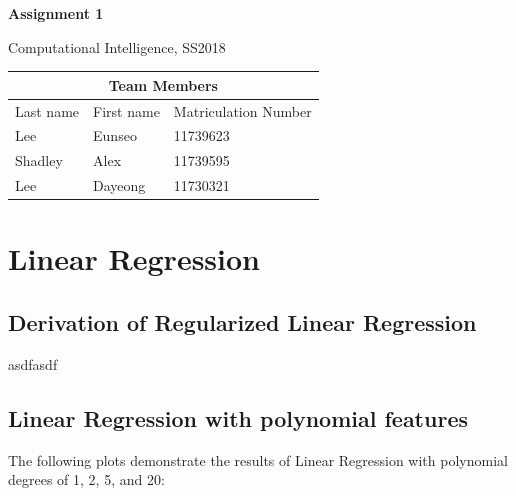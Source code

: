 \documentclass[a4paper]{article}
\begin{document}
\begin{titlepage}
	\centering
	{\huge \bf Assignment 1\par}
	\vspace{1cm}
	{\Large Computational Intelligence, SS2018\par}
	\vspace{1cm}
	\begin{tabular}{|l|l|l|}
	\hline
	\multicolumn{3}{|c|}{\textbf{Team Members}}   \\ \hline
	Last name & First name & Matriculation Number \\ \hline
	Lee       & Eunseo     & 11739623             \\ \hline
	Shadley   & Alex       & 11739595             \\ \hline
	Lee       & Dayeong    & 11730321             \\ \hline
	\end{tabular}
\end{titlepage}

\section{Linear Regression}
\subsection{Derivation of Regularized Linear Regression}
asdfasdf

\subsection{Linear Regression with polynomial features}

The following plots demonstrate the results of Linear Regression with polynomial degrees of 1, 2, 5, and 20:
\end{document}
